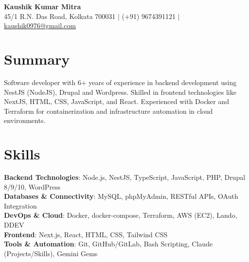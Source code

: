 \documentclass[a4paper,10pt]{article}
\begin{document}
\pagestyle{empty}

\begin{center}
    \textbf{\Huge Kaushik Kumar Mitra} \\ \vspace{2pt}
    45/1 R.N. Das Road, Kolkata 700031 $|$ (+91) 9674391121 $|$ \href{mailto:kaushik0976@gmail.com}{\underline{kaushik0976@gmail.com}}
\end{center}

\section{Summary}
\small{Software developer with 6+ years of experience in backend development using NestJS (NodeJS), Drupal and Wordpress. Skilled in frontend technologies like NextJS, HTML, CSS, JavaScript, and React. Experienced with Docker and Terraform for containerization and infrastructure automation in cloud environments.}

\section{Skills}
\begin{itemize}[leftmargin=0.15in, label={}]
    \small{\item{
     \textbf{Backend Technologies}{: Node.js, NestJS, TypeScript, JavaScript, PHP, Drupal 8/9/10, WordPress} \\
     \textbf{Databases \& Connectivity}{: MySQL, phpMyAdmin, RESTful APIs, OAuth Integration} \\
     \textbf{DevOps \& Cloud}{: Docker, docker-compose, Terraform, AWS (EC2), Lando, DDEV} \\
     \textbf{Frontend}{: Next.js, React, HTML, CSS, Tailwind CSS} \\
     \textbf{Tools \& Automation}{: Git, GitHub/GitLab, Bash Scripting, Claude (Projects/Skills), Gemini Gems}
    }}
\end{itemize}
\end{document}
